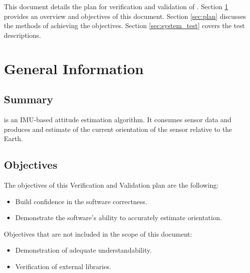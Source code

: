 \documentclass[12pt, titlepage]{article}
\begin{document}
This document details the plan for verification and validation of \progname{}. Section
\ref{sec:general} provides an overview and objectives of this document. Section \ref{sec:plan}
discusses the methods of achieving the objectives. Section \ref{sec:system_test} covers the test
descriptions.


\section{General Information} \label{sec:general}

\subsection{Summary}

\progname{} is an IMU-based attitude estimation algorithm. It consumes sensor data and produces and
estimate of the current orientation of the sensor relative to the Earth.


\subsection{Objectives}

The objectives of this Verification and Validation plan are the following:

\begin{itemize}
    \item Build confidence in the software correctness.
    \item Demonstrate the software's ability to accurately estimate orientation.
\end{itemize}


\noindent
Objectives that are not included in the scope of this document:

\begin{itemize}
    \item Demonstration of adequate understandability.
    \item Verification of external libraries.
\end{itemize}
\end{document}
